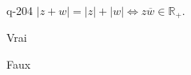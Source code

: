 \begin{truefalse}{q-204}
$|z+w|= |z|+|w| \iff z\overline{w} \in \mathbb R_{+}$.
\item* Vrai
\item Faux
\end{truefalse}


